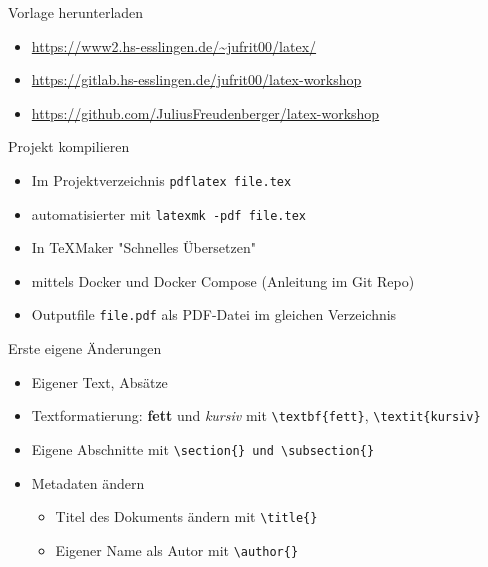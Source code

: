 \documentclass[presentation,aspectratio=169]{beamer}
\begin{document}
\begin{frame}{Vorlage herunterladen}
  \begin{itemize}
    \item \href{https://www2.hs-esslingen.de/~jufrit00/latex/}{https://www2.hs-esslingen.de/\textasciitilde{}jufrit00/latex/}
    \item \href{https://gitlab.hs-esslingen.de/jufrit00/latex-workshop}{https://gitlab.hs-esslingen.de/jufrit00/latex-workshop}
    \item \href{https://github.com/JuliusFreudenberger/latex-workshop}{https://github.com/JuliusFreudenberger/latex-workshop}
  \end{itemize}
\end{frame}

\begin{frame}[fragile]{Projekt kompilieren}
  \begin{itemize}
    \item Im Projektverzeichnis \verb|pdflatex file.tex|
    \item automatisierter mit \verb|latexmk -pdf file.tex|
    \item In \TeX{}Maker "Schnelles Übersetzen"
    \item mittels Docker und Docker Compose (Anleitung im Git Repo)
    \item Outputfile \verb|file.pdf| als PDF-Datei im gleichen Verzeichnis
  \end{itemize}
\end{frame}

\begin{frame}[fragile]{Erste eigene Änderungen}
  \begin{itemize}
    \item Eigener Text, Absätze
    \item Textformatierung: \textbf{fett} und \textit{kursiv} mit \verb|\textbf{fett}|, \verb|\textit{kursiv}|
    \item Eigene Abschnitte mit \verb|\section{} und \subsection{}|
    \item Metadaten ändern
      \begin{itemize}
        \item Titel des Dokuments ändern mit \verb|\title{}|
        \item Eigener Name als Autor mit \verb|\author{}|
      \end{itemize}
  \end{itemize}
\end{frame}
\end{document}
